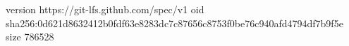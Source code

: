 version https://git-lfs.github.com/spec/v1
oid sha256:0d621d8632412b0fdf63e8283dc7c87656c8753f0be76c940afd4794df7b9f5e
size 786528
